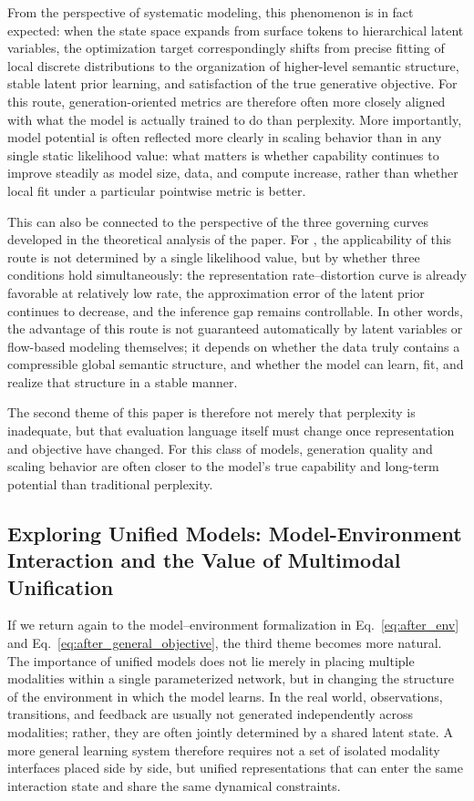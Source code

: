 From the perspective of systematic modeling, this phenomenon is in fact expected: when the state space expands from surface tokens to hierarchical latent variables, the optimization target correspondingly shifts from precise fitting of local discrete distributions to the organization of higher-level semantic structure, stable latent prior learning, and satisfaction of the true generative objective. For this route, generation-oriented metrics are therefore often more closely aligned with what the model is actually trained to do than perplexity. More importantly, model potential is often reflected more clearly in scaling behavior than in any single static likelihood value: what matters is whether capability continues to improve steadily as model size, data, and compute increase, rather than whether local fit under a particular pointwise metric is better.

This can also be connected to the perspective of the three governing curves developed in the theoretical analysis of the paper. For \method, the applicability of this route is not determined by a single likelihood value, but by whether three conditions hold simultaneously: the representation rate--distortion curve is already favorable at relatively low rate, the approximation error of the latent prior continues to decrease, and the inference gap remains controllable. In other words, the advantage of this route is not guaranteed automatically by latent variables or flow-based modeling themselves; it depends on whether the data truly contains a compressible global semantic structure, and whether the model can learn, fit, and realize that structure in a stable manner.

The second theme of this paper is therefore not merely that perplexity is inadequate, but that evaluation language itself must change once representation and objective have changed. For this class of models, generation quality and scaling behavior are often closer to the model's true capability and long-term potential than traditional perplexity.

\subsection{Exploring Unified Models: Model-Environment Interaction and the Value of Multimodal Unification}

If we return again to the model--environment formalization in Eq.~\eqref{eq:after_env} and Eq.~\eqref{eq:after_general_objective}, the third theme becomes more natural. The importance of unified models does not lie merely in placing multiple modalities within a single parameterized network, but in changing the structure of the environment in which the model learns. In the real world, observations, transitions, and feedback are usually not generated independently across modalities; rather, they are often jointly determined by a shared latent state. A more general learning system therefore requires not a set of isolated modality interfaces placed side by side, but unified representations that can enter the same interaction state and share the same dynamical constraints.

